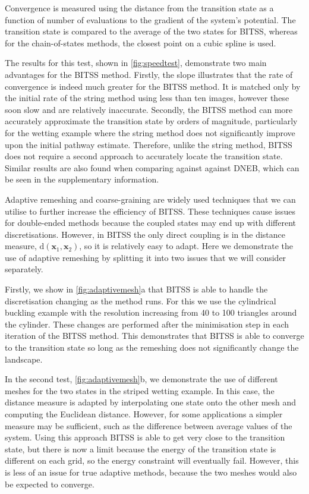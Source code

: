 \documentclass[aps,prl,twocolumn,groupedaddress]{revtex4}
\begin{document}
\topic Convergence is measured using the distance from the transition state as a function of number of evaluations to the gradient of the system's potential.
The transition state is compared to the average of the two states for BITSS, whereas for the chain-of-states methods, the closest point on a cubic spline is used.

\topic The results for this test, shown in \cref{fig:speedtest}, demonstrate two main advantages for the BITSS method.
Firstly, the slope illustrates that the rate of convergence is indeed much greater for the BITSS method.
It is matched only by the initial rate of the string method using less than ten images, however these soon slow and are relatively inaccurate.
Secondly, the BITSS method can more accurately approximate the transition state by orders of magnitude, particularly for the wetting example where the string method does not significantly improve upon the initial pathway estimate.
Therefore, unlike the string method, BITSS does not require a second approach to accurately locate the transition state.
Similar results are also found when comparing against against DNEB, which can be seen in the supplementary information.


\topic Adaptive remeshing and coarse-graining are widely used techniques that we can utilise to further increase the efficiency of BITSS.
These techniques cause issues for double-ended methods because the coupled states may end up with different discretisations.
However, in BITSS the only direct coupling is in the distance measure, $\mathrm{d}(\bm{x}_1,\bm{x}_2)$, so it is relatively easy to adapt.
Here we demonstrate the use of adaptive remeshing by splitting it into two issues that we will consider separately.

\topic Firstly, we show in \cref{fig:adaptivemesh}a that BITSS is able to handle the discretisation changing as the method runs.
For this we use the cylindrical buckling example with the resolution increasing from 40 to 100 triangles around the cylinder.
These changes are performed after the minimisation step in each iteration of the BITSS method.
This demonstrates that BITSS is able to converge to the transition state so long as the remeshing does not significantly change the landscape.

\topic In the second test, \cref{fig:adaptivemesh}b, we demonstrate the use of different meshes for the two states in the striped wetting example.
In this case, the distance measure is adapted by interpolating one state onto the other mesh and computing the Euclidean distance.
However, for some applications a simpler measure may be sufficient, such as the difference between average values of the system.
Using this approach BITSS is able to get very close to the transition state, but there is now a limit because the energy of the transition state is different on each grid, so the energy constraint will eventually fail.
However, this is less of an issue for true adaptive methods, because the two meshes would also be expected to converge.
\end{document}
